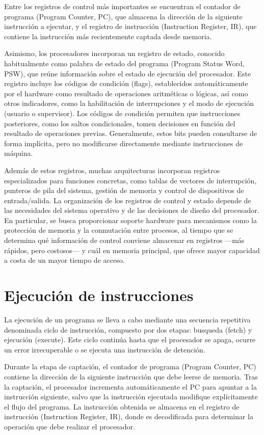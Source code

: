 Entre los registros de control más importantes se encuentran el contador de programa (Program Counter, PC), que almacena la dirección de la siguiente instrucción a ejecutar, y el registro de instrucción (Instruction Register, IR), que contiene la instrucción más recientemente captada desde memoria.

Asimismo, los procesadores incorporan un registro de estado, conocido habitualmente como palabra de estado del programa (Program Status Word, PSW), que reúne información sobre el estado de ejecución del procesador. Este registro incluye los códigos de condición (flags), establecidos automáticamente por el hardware como resultado de operaciones aritméticas o lógicas, así como otros indicadores, como la habilitación de interrupciones y el modo de ejecución (usuario o supervisor). Los códigos de condición permiten que instrucciones posteriores, como los saltos condicionales, tomen decisiones en función del resultado de operaciones previas. Generalmente, estos bits pueden consultarse de forma implícita, pero no modificarse directamente mediante instrucciones de máquina.

Además de estos registros, muchas arquitecturas incorporan registros especializados para funciones concretas, como tablas de vectores de interrupción, punteros de pila del sistema, gestión de memoria y control de dispositivos de entrada/salida. La organización de los registros de control y estado depende de las necesidades del sistema operativo y de las decisiones de diseño del procesador. En particular, se busca proporcionar soporte hardware para mecanismos como la protección de memoria y la conmutación entre procesos, al tiempo que se determina qué información de control conviene almacenar en registros ---más rápidos, pero costosos--- y cuál en memoria principal, que ofrece mayor capacidad a costa de un mayor tiempo de acceso.

\section{Ejecución de instrucciones}

La ejecución de un programa se lleva a cabo mediante una secuencia repetitiva denominada ciclo de instrucción, compuesto por dos etapas: busqueda (fetch) y ejecución (execute). Este ciclo continúa hasta que el procesador se apaga, ocurre un error irrecuperable o se ejecuta una instrucción de detención.

Durante la etapa de captación, el contador de programa (Program Counter, PC) contiene la dirección de la siguiente instrucción que debe leerse de memoria. Tras la captación, el procesador incrementa automáticamente el PC para apuntar a la instrucción siguiente, salvo que la instrucción ejecutada modifique explícitamente el flujo del programa. La instrucción obtenida se almacena en el registro de instrucción (Instruction Register, IR), donde es decodificada para determinar la operación que debe realizar el procesador.

